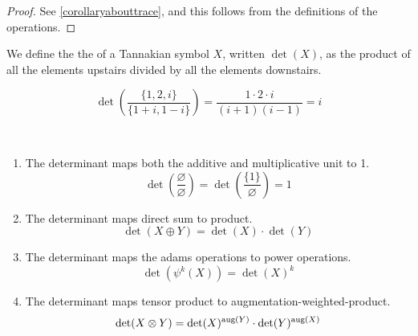 \begin{proof}
See \ref{corollaryabouttrace}, and this follows from the definitions of the operations.
\end{proof}

\begin{definition}
We define the the  of a Tannakian symbol $X$, written $\det(X)$, as the product of all the elements upstairs divided by all the elements downstairs.
\end{definition}

\begin{example}
$$\det\left(\frac{\{1, 2, i\}}{\{1 + i, 1 - i\}}\right) = \frac{1 \cdot 2 \cdot i}{(i + 1)(i - 1)} = i$$
\end{example}

\begin{proposition}
\ \\ \begin{enumerate}
\item The determinant maps both the additive and multiplicative unit to 1.
$$\det\left(\frac{\varnothing}{\varnothing}\right) = \det\left(\frac{\{1\}}{\varnothing}\right) = 1$$
\item The determinant maps direct sum to product.
$$\det(X \oplus Y) = \det(X) \cdot \det(Y)$$
\item The determinant maps the adams operations to power operations.
$$\det(\psi^k(X)) = \det(X)^k$$
\item The determinant maps tensor product to augmentation-weighted-product.
$$\det(X \otimes Y) = \det(X)^{\mathrm{aug}(Y)} \cdot \det(Y)^{\mathrm{aug}(X)}$$
\end{enumerate}
\end{proposition}

